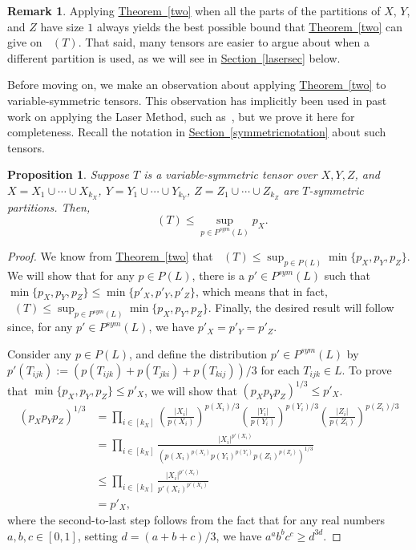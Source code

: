 \documentclass[11pt]{article}
\numberwithin{equation}{section}
\newtheorem{proposition}[theorem]{Proposition}
\theoremstyle{definition}
\newtheorem{remark}[theorem]{Remark}
\theoremstyle{plain}
\newcommand{\expref}[2]{\hyperref[#2]{#1~\ref{#2}}}
\newcommand{\tsr}{\mathop{\tilde{\operatorname{S}}}}
\theoremstyle{definition}
\begin{document}
\begin{remark}
Applying \expref{Theorem}{two} when all the parts of the partitions of $X$, $Y$, and $Z$ have size $1$ always yields the best possible bound that \expref{Theorem}{two} can give on $\tsr(T)$. That said, many tensors are easier to argue about when a different partition is used, as we will see in \expref{Section}{lasersec} below.
\end{remark}


Before moving on, we make an observation about applying \expref{Theorem}{two} to variable-symmetric tensors. This observation has implicitly been used in past work on applying the Laser Method, such as~\cite{coppersmith}, but we prove it here for completeness. Recall the notation in \expref{Section}{symmetricnotation} about such tensors.

\begin{proposition} \label{symmprop}
Suppose $T$ is a variable-symmetric tensor over $X,Y,Z$, and $X = X_1 \cup \cdots \cup X_{k_X}$, $Y = Y_1 \cup \cdots \cup Y_{k_Y}$, $Z = Z_1 \cup \cdots \cup Z_{k_Z}$ are $T$-symmetric partitions. Then,
$$\tsr(T) \leq \sup_{p \in P^{sym}(L)} p_X.$$
\end{proposition}

\begin{proof}
We know from \expref{Theorem}{two} that $\tsr(T) \leq \sup_{p \in P(L)} \min\{ p_X, p_Y, p_Z \}$. We will show that for any $p \in P(L)$, there is a $p' \in P^{sym}(L)$ such that $\min\{ p_X, p_Y, p_Z \} \leq \min\{ p'_X, p'_Y, p'_Z \}$, which means that in fact, $\tsr(T) \leq \sup_{p \in P^{sym}(L)} \min\{ p_X, p_Y, p_Z \}$. Finally, the desired result will follow since, for any $p' \in P^{sym}(L)$, we have $p'_X = p'_Y = p'_Z$. 

Consider any $p \in P(L)$, and define the distribution $p' \in P^{sym}(L)$ by $p'(T_{ijk}) := (p(T_{ijk}) + p(T_{jki}) + p(T_{kij}))/3$ for each $T_{ijk} \in L$. To prove that $\min\{ p_X, p_Y, p_Z \} \leq p'_X$, we will show that $(p_X p_Y p_Z)^{1/3}\leq p'_X$.
\begin{align*} 
(p_X p_Y p_Z)^{1/3} &=  \prod_{i \in [k_X]} \left( \frac{|X_i|}{p(X_i)}\right)^{p(X_i)/3} \left( \frac{|Y_i|}{p(Y_i)}\right)^{p(Y_i)/3} \left( \frac{|Z_i|}{p(Z_i)}\right)^{p(Z_i)/3}  \\
&= \prod_{i \in [k_X]} \frac{|X_i|^{p'(X_i)}}{(p(X_i)^{p(X_i)} p(Y_i)^{p(Y_i)} p(Z_i)^{p(Z_i)})^{1/3}} \\
&\leq \prod_{i \in [k_X]} \frac{|X_i|^{p'(X_i)}}{p'(X_i)^{p'(X_i)}} \\ 
&= p'_X,
\end{align*}
where the second-to-last step follows from the fact that for any real numbers $a,b,c \in [0,1]$, setting $d = (a+b+c)/3$, we have $a^a b^b c^c \geq d^{3d}$.
\end{proof}
\end{document}
